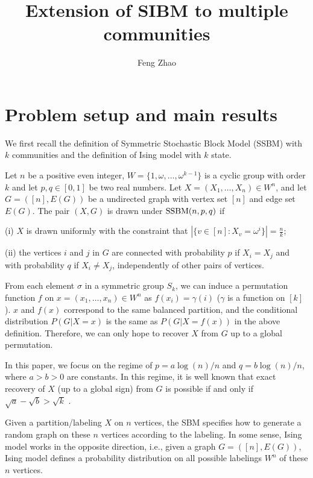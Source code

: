 \documentclass{article}
\title{Extension of SIBM to multiple communities}
\author{Feng Zhao}
\begin{document}
\maketitle

\section{Problem setup and main results} \label{s:Preliminaries}
We first recall the definition of Symmetric Stochastic Block Model (SSBM) with $k$ communities and the definition of Ising model with $k$ state.
\begin{definition} \label{def:SSBM}
Let $n$ be a positive even integer, $W= \{1, \omega, \dots, \omega^{k-1}\}$ is a cyclic group with order $k$ and let $p,q\in[0,1]$ be two real numbers. Let $X=(X_1,\dots,X_n)\in W^n$, and let $G=([n],E(G))$ be a undirected graph with vertex set $[n]$ and edge set $E(G)$. The pair $(X,G)$ is drawn under $\operatorname{SSBM}(n,p,q)$ if 

\noindent
(i) $X$ is drawn uniformly with the constraint that $|\{v \in [n] : X_v = \omega^i\}| = \frac{n}{k}$;

\noindent
(ii) the vertices $i$ and $j$ in $G$ are connected with probability $p$ if $X_i=X_j$ and with probability $q$ if $X_i \neq X_j$, independently of other pairs of vertices.
\end{definition}
 
From each element $\sigma$ in a symmetric group $S_k$, we can induce a permutation function $f$ on $x=(x_1,\dots,x_n)\in W^n$ as $f(x_i) = \gamma(i)$ ($\gamma$ is a function on $[k]$).
$x$ and $f(x)$ correspond to the same balanced partition, and the conditional distribution $P(G|X=x)$ is the same as $P(G|X=f(x))$ in the above definition. Therefore, we can only hope to recover $X$ from $G$ up to a global permutation.

In this paper, we focus on the regime of $p=a\log(n)/n$ and $q=b\log(n)/n$, where $a>b> 0$ are constants. In this regime, it is well known that exact recovery of $X$ (up to a global sign) from $G$ is possible if and only if $\sqrt{a}-\sqrt{b} > \sqrt{k}$  \cite{abbe2015exact}.
 
Given a partition/labeling $X$ on $n$ vertices, the SBM specifies how to generate a random graph on these $n$ vertices according to the labeling. In some sense, Ising model works in the opposite direction, i.e., given a graph $G=([n],E(G))$, Ising model defines a probability distribution on all possible labelings $W^n$ of these $n$ vertices. 
\end{document}
